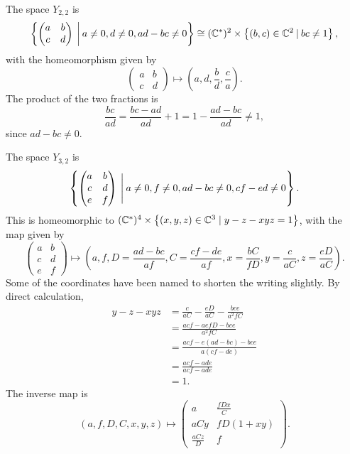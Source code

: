 \begin{example}
  The space $Y_{2,2}$ is
  \[ \left\{ 
    \begin{pmatrix}
      a & b \\
      c & d
    \end{pmatrix} \:\bigg\vert\: a \neq 0, d \neq 0, ad-bc
    \neq 0  \right\} \cong (\mathbb{C}^*)^2 \times \left\{ (b,c)\in\mathbb{C}^2 \:\vert\:
    bc \neq 1 \right\}, \]
  with the homeomorphism given by
  \[
  \begin{pmatrix}
    a & b\\
    c & d
  \end{pmatrix} \mapsto \left(a,d,\frac{b}{d},\frac{c}{a}\right).\]
  The product of the two fractions is
  \[ \frac{bc}{ad} = \frac{bc-ad}{ad} + 1 = 1-\frac{ad-bc}{ad} \neq
  1, \]
  since $ad-bc \neq 0$.
\end{example}

\begin{example}
  The space $Y_{3,2}$ is
  \[\left\{ 
  \begin{pmatrix}
    a &b \\
    c & d \\
    e & f
  \end{pmatrix} \:\Bigg\vert\: a \neq 0, f \neq 0, ad-bc \neq
  0, cf-ed \neq 0 \right\}.
  \]
  This is homeomorphic to $(\mathbb{C}^*)^4\times \left\{ (x,y,z)\in\mathbb{C}^3 \mid
    y-z-xyz = 1 \right\}$, with the map given by
  \[
  \begin{pmatrix}
    a &b \\
    c & d \\
    e & f
  \end{pmatrix} \mapsto
  \left(a, f, D=\frac{ad-bc}{af}, C=\frac{cf-de}{af}, x=\frac{bC}{fD},
    y=\frac{c}{aC}, z=\frac{eD}{aC} \right). \]
  Some of the coordinates have been named to shorten the writing
  slightly. By direct calculation,
  \begin{align*}
    y-z-xyz &= \frac{c}{aC}-\frac{eD}{aC}-\frac{bce}{a^2fC} \\
            &= \frac{acf-aefD-bce}{a^2fC} \\
            &= \frac{acf-e(ad-bc)-bce}{a(cf-de)}  \\
            &= \frac{acf-ade}{acf-ade} \\
            &= 1.
  \end{align*}
  The inverse map is
  \[ (a,f,D,C,x,y,z) \mapsto
  \begin{pmatrix}
    a & \frac{fDx}{C} \\
    aCy & fD(1+xy) \\
    \frac{aCz}{D} & f
  \end{pmatrix}. \]
\end{example}


